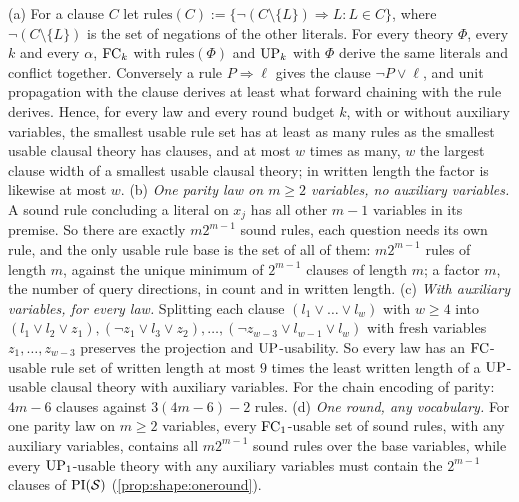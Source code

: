 \begin{proposition}\label{prop:shape:rules}
(a) For a clause $C$ let $\mathrm{rules}(C):=\{\neg(C\setminus\{L\})\Rightarrow L:L\in C\}$, where $\neg(C\setminus\{L\})$ is the set of negations of the other literals. For every theory $\Phi$, every $k$ and every $\alpha$, $\mathrm{FC}_k$ with $\mathrm{rules}(\Phi)$ and $\mathrm{UP}_k$ with $\Phi$ derive the same literals and conflict together. Conversely a rule $P\Rightarrow\ell$ gives the clause $\neg P\vee\ell$, and unit propagation with the clause derives at least what forward chaining with the rule derives. Hence, for every law and every round budget $k$, with or without auxiliary variables, the smallest usable rule set has at least as many rules as the smallest usable clausal theory has clauses, and at most $w$ times as many, $w$ the largest clause width of a smallest usable clausal theory; in written length the factor is likewise at most $w$.
(b) \emph{One parity law on $m\ge2$ variables, no auxiliary variables.} A sound rule concluding a literal on $x_j$ has all other $m-1$ variables in its premise. So there are exactly $m2^{m-1}$ sound rules, each question needs its own rule, and the only usable rule base is the set of all of them: $m2^{m-1}$ rules of length $m$, against the unique minimum of $2^{m-1}$ clauses of length $m$; a factor $m$, the number of query directions, in count and in written length.
(c) \emph{With auxiliary variables, for every law.} Splitting each clause $(l_1\vee\dots\vee l_w)$ with $w\ge4$ into $(l_1\vee l_2\vee z_1),(\neg z_1\vee l_3\vee z_2),\dots,(\neg z_{w-3}\vee l_{w-1}\vee l_w)$ with fresh variables $z_1,\dots,z_{w-3}$ preserves the projection and $\mathrm{UP}$-usability. So every law has an $\mathrm{FC}$-usable rule set of written length at most $9$ times the least written length of a $\mathrm{UP}$-usable clausal theory with auxiliary variables. For the chain encoding of parity: $4m-6$ clauses against $3(4m-6)-2$ rules.
(d) \emph{One round, any vocabulary.} For one parity law on $m\ge2$ variables, every $\mathrm{FC}_1$-usable set of sound rules, with any auxiliary variables, contains all $m2^{m-1}$ sound rules over the base variables, while every $\mathrm{UP}_1$-usable theory with any auxiliary variables must contain the $2^{m-1}$ clauses of $\mathrm{PI}(\mathcal S)$ (\cref{prop:shape:oneround}).
\end{proposition}


